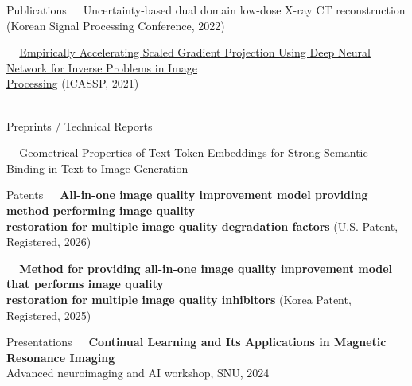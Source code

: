 \documentclass{resume} %
\newcommand{\mycolor}[1]{\textcolor{myurlcolor}{#1}}
\begin{document}
\begin{rSection}{Publications}
\textbullet~\,\, {\mycolor{Uncertainty-based dual domain low-dose X-ray CT reconstruction}} (Korean Signal Processing Conference, 2022)
\\  

\textbullet~\,\, \href{https://ieeexplore.ieee.org/document/9415023}{Empirically Accelerating Scaled Gradient Projection Using Deep Neural Network for Inverse Problems in Image \\ \hspace*{1.5em}Processing} (ICASSP, 2021)
\\  \\
\end{rSection} 

\vskip -0.2in

\begin{rSection}{Preprints / Technical Reports}

\textbullet~\,\, \href{https://arxiv.org/pdf/2503.23011}{Geometrical Properties of Text Token Embeddings for Strong Semantic Binding in Text-to-Image Generation}
\\ 

\end{rSection}

\vskip -0.1in

\begin{rSection}{Patents}
\textbullet~\,\, \textbf{All-in-one image quality improvement model providing method performing image quality \\\hspace*{1.4em}restoration for multiple image quality degradation factors} (U.S. Patent, Registered, 2026)
\\ 


\textbullet~\,\, \textbf{Method for providing all-in-one image quality improvement model that performs image quality \\\hspace*{1.4em}restoration for multiple image quality inhibitors} (Korea Patent, Registered, 2025)
\\ 
\end{rSection}



\begin{rSection}{Presentations}
\textbullet~\,\, \textbf{Continual Learning and Its Applications in Magnetic Resonance Imaging}
\\ \hspace*{1.5em}Advanced neuroimaging and AI workshop, SNU, 2024 \\
\end{rSection}
\end{document}
